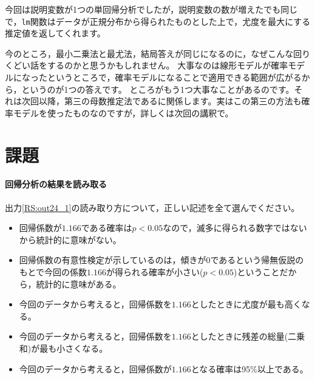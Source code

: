 \documentclass{ltjbook}
\begin{document}
今回は説明変数が1つの単回帰分析でしたが，説明変数の数が増えたでも同じで，\verb|lm|関数はデータが正規分布から得られたものとした上で，尤度を最大にする推定値を返してくれます。

今のところ，最小二乗法と最尤法，結局答えが同じになるのに，なぜこんな回りくどい話をするのかと思うかもしれません。
大事なのは線形モデルが確率モデルになったというところで，確率モデルになることで適用できる範囲が広がるから，というのが1つの答えです。
ところがもう1つ大事なことがあるのです。それは次回以降，第三の母数推定法であるに関係します。実はこの第三の方法も確率モデルを使ったものなのですが，詳しくは次回の講釈で。

\section{課題}
\paragraph{回帰分析の結果を読み取る}出力\ref{RS:out24_1}の読み取り方について，正しい記述を全て選んでください。
\begin{itemize}
    \item 回帰係数が$1.166$である確率は$p<0.05$なので，滅多に得られる数字ではないから統計的に意味がない。
    \item 回帰係数の有意性検定が示しているのは，傾きが0であるという帰無仮説のもとで今回の係数$1.166$が得られる確率が小さい($p<0.05$)ということだから，統計的に意味がある。
    \item 今回のデータから考えると，回帰係数を$1.166$としたときに尤度が最も高くなる。
    \item 今回のデータから考えると，回帰係数を$1.166$としたときに残差の総量(二乗和)が最も小さくなる。
    \item 今回のデータから考えると，回帰係数が$1.166$となる確率は95\%以上である。
\end{itemize}
\end{document}
